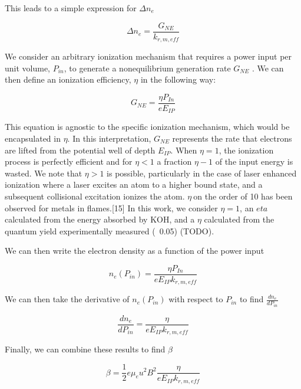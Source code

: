 This leads to a simple expression for $\Delta n_{e}$

\begin{equation}
\Delta n_{e} = \frac{G_{NE}}{k_{r, m, eff}}
\end{equation}


We consider an arbitrary ionization mechanism that requires a power input per unit volume, \(P_{in}\), to generate a nonequilibrium generation rate \(G_{NE}\) . We can then define an ionization efficiency, \(\eta\) in the following way:

\begin{equation}
{G}_{NE} = \frac{\eta P_{In}}{eE_{IP}}
\end{equation}


This equation is agnostic to the specific ionization mechanism, which would be encapsulated in \(\eta\). In this interpretation, \(G_{NE}\) represents the rate that electrons are lifted from the potential well of depth \(E_{IP}\). When \(\eta = 1\), the ionization process is perfectly efficient and for \(\eta < 1\) a fraction \(\eta - 1\) of the input energy is wasted. We note that \(\eta > 1\) is possible, particularly in the case of laser enhanced ionization where a laser excites an atom to a higher bound state, and a subsequent collisional excitation ionizes the atom. \(\eta\ \)on the order of 10 has been observed for metals in flames.{[}15{]} In this work, we consider $\eta =1$, an $eta$ calculated from the energy absorbed by KOH, and a $\eta$ calculated from the quantum yield experimentally measured (~0.05) (TODO). 

We can then write the electron density as a function of the power input

\begin{equation}
n_{e}(P_{in}) = \frac{\eta P_{In}}{eE_{IP}k_{r, m, eff}}
\end{equation}

We can then take the derivative of $n_{e}(P_{in})$ with respect to $P_{in}$ to find $\frac{dn_{e}}{dP_{in}}$

\begin{equation}
\frac{dn_{e}}{dP_{in}} = \frac{\eta}{eE_{IP}k_{r, m, eff}}
\end{equation}

Finally, we can combine these results to find $\beta$

\begin{equation}
\beta = \frac{1}{2} e \mu_e u^2 B^2 \frac{\eta}{eE_{IP}k_{r, m, eff}}
\end{equation}

